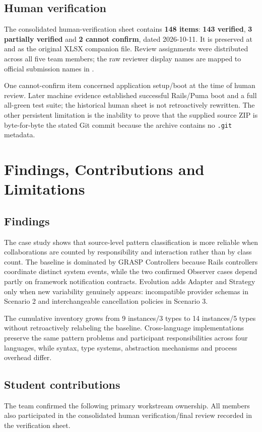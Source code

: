 \documentclass[11pt,a4paper]{article}
\renewcommand{\_}{\textunderscore\allowbreak}
\begin{document}
\subsection{Human verification}
The consolidated human-verification sheet contains \textbf{148 items}: \textbf{143 verified}, \textbf{3 partially verified} and \textbf{2 cannot confirm}, dated 2026-10-11. It is preserved at  and as the original XLSX companion file. Review assignments were distributed across all five team members; the raw reviewer display names are mapped to official submission names in .

One cannot-confirm item concerned application setup/boot at the time of human review. Later machine evidence established successful Rails/Puma boot and a full all-green test suite; the historical human sheet is not retroactively rewritten. The other persistent limitation is the inability to prove that the supplied source ZIP is byte-for-byte the stated Git commit because the archive contains no \texttt{.git} metadata.

\section{Findings, Contributions and Limitations}
\subsection{Findings}
The case study shows that source-level pattern classification is more reliable when collaborations are counted by responsibility and interaction rather than by class count. The baseline is dominated by GRASP Controllers because Rails controllers coordinate distinct system events, while the two confirmed Observer cases depend partly on framework notification contracts. Evolution adds Adapter and Strategy only when new variability genuinely appears: incompatible provider schemas in Scenario 2 and interchangeable cancellation policies in Scenario 3.

The cumulative inventory grows from 9 instances/3 types to 14 instances/5 types without retroactively relabeling the baseline. Cross-language implementations preserve the same pattern problems and participant responsibilities across four languages, while syntax, type systems, abstraction mechanisms and process overhead differ.

\subsection{Student contributions}
The team confirmed the following primary workstream ownership. All members also participated in the consolidated human verification/final review recorded in the verification sheet.
\end{document}
